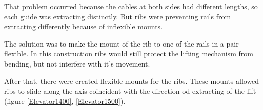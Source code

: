\begin{enumerate*}
  That problem occurred because the cables at both sides had different lengths, so each guide was extracting distinctly. But ribs were preventing rails from extracting differently because of inflexible mounts.

  The solution was to make the mount of the rib to one of the rails in a pair flexible. In this construction ribs would still protect the lifting mechanism from bending, but not interfere with it's movement.

  \item After that, there were created flexible mounts for the ribs. These mounts allowed ribs to slide along the axis coincident with the direction od extracting of the lift (figure \ref{Elevator1400}, \ref{Elevator1500}).
  
  \begin{figure}[H]
  	\begin{minipage}[h]{0.47\linewidth}

\end{minipage}
\end{figure}
\end{enumerate*}
